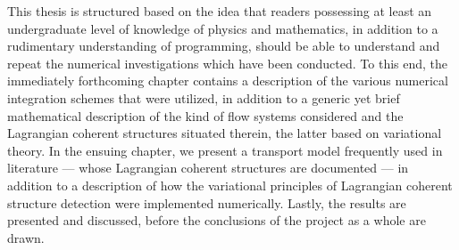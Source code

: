 This thesis is structured based on the idea that readers possessing
at least an undergraduate level of knowledge of physics and mathematics, in
addition to a rudimentary understanding of programming, should be able to
understand and repeat the numerical investigations which have been conducted.
To this end, the immediately forthcoming chapter contains a description of the
various numerical integration schemes that were utilized, in addition to a
generic yet brief mathematical description of the kind of flow systems
considered and the Lagrangian coherent structures situated therein, the latter
based on variational theory. In the ensuing chapter, we present a transport
model frequently used in literature --- whose Lagrangian coherent structures
are documented --- in addition to a description of how the variational
principles of Lagrangian coherent structure detection were implemented
numerically. Lastly, the results are presented and discussed, before the
conclusions of the project as a whole are drawn.


